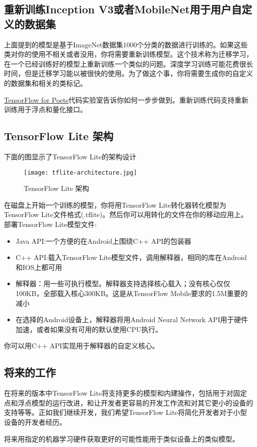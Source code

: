 \subsection{重新训练Inception V3或者MobileNet用于用户自定义的数据集}
上面提到的模型是基于ImageNet数据集1000个分类的数据进行训练的。如果这些类对你的使用不相关或者没用，你将需要重新训练模型。这个技术称为迁移学习，在一个已经训练好的模型上重新训练一个类似的问题。深度学习训练可能花费很长时间，但是迁移学习能以被很快的使用。为了做这个事，你将需要生成你的自定义的数据集和相关的类标记。

\href{https://codelabs.developers.google.com/codelabs/tensorflow-for-poets/?hl=zh-cn}{TensorFlow for Poets}代码实验室告诉你如何一步步做到。重新训练代码支持重新训练用于浮点和量化接口。
\subsection{TensorFlow Lite 架构}
下面的图显示了TensorFlow Lite的架构设计
\begin{figure}[H]
\centering
\texttt{[image: tflite-architecture.jpg]}
\caption{TensorFlow Lite 架构}
\end{figure}
在磁盘上开始一个训练的模型，你将用TensorFlow Lite转化器转化模型为TensorFlow Lite文件格式(.tflite)。然后你可以用转化的文件在你的移动应用上。
部署TensorFlow Lite模型文件:
\begin{itemize}
\item Java API:一个方便的在Android上围绕C++ API的包装器
\item C++ API:载入TensorFlow Lite模型文件，调用解释器，相同的库在Android和IOS上都可用
\item 解释器：用一些可执行模型。解释器支持选择核心载入；没有核心仅仅100KB，全部载入核心300KB。这是从TensorFlow Mobile要求的1.5M重要的减小
\item 在选择的Android设备上，解释器将用Android Neural Network API用于硬件加速，或者如果没有可用的默认使用CPU执行。
\end{itemize}
你可以用C++ API实现用于解释器的自定义核心。
\subsection{将来的工作}
在将来的版本中TensorFlow Lite将支持更多的模型和内建操作，包括用于对固定点和浮点模型的运行改进，和让开发者更容易的开发工作流和对其它更小的设备的支持等等。正如我们继续开发，我们希望TensorFlow Lite将简化开发者对于小型设备的开发者经历。

将来用指定的机器学习硬件获取更好的可能性能用于类似设备上的类似模型。
